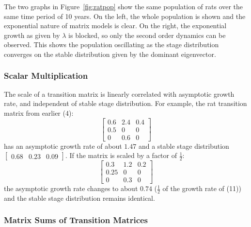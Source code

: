 \documentclass{article}
\begin{document}
    The two graphs in Figure~\ref{fig:ratpop} show the same population of rats over the same time period of 10 years.
    On the left, the whole population is shown and the exponential nature of matrix models is clear.
    On the right, the exponential growth as given by $\lambda$ is blocked, so only the second order dynamics can be observed.
    This shows the population oscillating as the stage distribution converges on the stable distribution given by the dominant eigenvector.

    \subsubsection{Scalar Multiplication}

    \hspace{\parindent}The scale of a transition matrix is linearly correlated with asymptotic growth rate, and independent of stable stage distribution.
    For example, the rat transition matrix from earlier (4):
    \begin{equation}
        \begin{bmatrix}
            0.6 & 2.4 & 0.4 \\
            0.5 & 0   & 0   \\
            0   & 0.6 & 0
        \end{bmatrix}\label{eq:equation11}
    \end{equation}
    has an asymptotic growth rate of about $1.47$ and a stable stage distribution $\begin{bmatrix} 0.68 & 0.23 & 0.09 \end{bmatrix}$.
    If the matrix is scaled by a factor of $\frac{1}{2}$:
    \begin{equation}
        \begin{bmatrix}
            0.3  & 1.2 & 0.2 \\
            0.25 & 0   & 0   \\
            0    & 0.3 & 0
        \end{bmatrix}\label{eq:equation12}
    \end{equation}
    the asymptotic growth rate changes to about $0.74$ ($\frac{1}{2}$ of the growth rate of (11)) and the stable stage distribution remains identical.

    \subsubsection{Matrix Sums of Transition Matrices}
\end{document}
